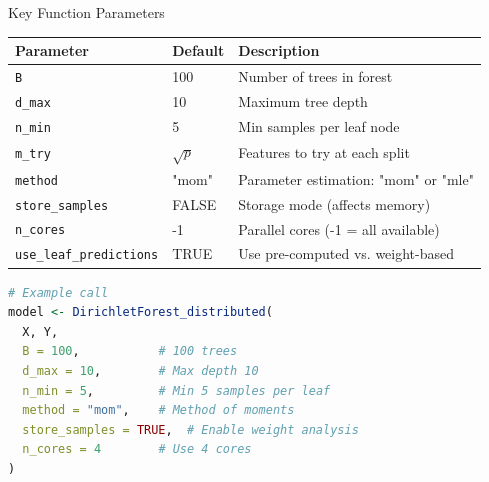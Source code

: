 \documentclass[aspectratio=169]{beamer}
\begin{document}
\begin{frame}[fragile]{Key Function Parameters}

\begin{table}
\small
\begin{tabular}{lp{3cm}p{5cm}}
\toprule
\textbf{Parameter} & \textbf{Default} & \textbf{Description} \\
\midrule
\texttt{B} & 100 & Number of trees in forest \\
\texttt{d\_max} & 10 & Maximum tree depth \\
\texttt{n\_min} & 5 & Min samples per leaf node \\
\texttt{m\_try} & $\sqrt{p}$ & Features to try at each split \\
\texttt{method} & "mom" & Parameter estimation: "mom" or "mle" \\
\texttt{store\_samples} & FALSE & Storage mode (affects memory) \\
\texttt{n\_cores} & -1 & Parallel cores (-1 = all available) \\
\texttt{use\_leaf\_predictions} & TRUE & Use pre-computed vs. weight-based \\
\bottomrule
\end{tabular}
\end{table}

\vspace{0.3cm}

\begin{lstlisting}[language=R, basicstyle=\tiny\ttfamily]
# Example call
model <- DirichletForest_distributed(
  X, Y, 
  B = 100,           # 100 trees
  d_max = 10,        # Max depth 10
  n_min = 5,         # Min 5 samples per leaf
  method = "mom",    # Method of moments
  store_samples = TRUE,  # Enable weight analysis
  n_cores = 4        # Use 4 cores
)
\end{lstlisting}

\end{frame}
\end{document}
